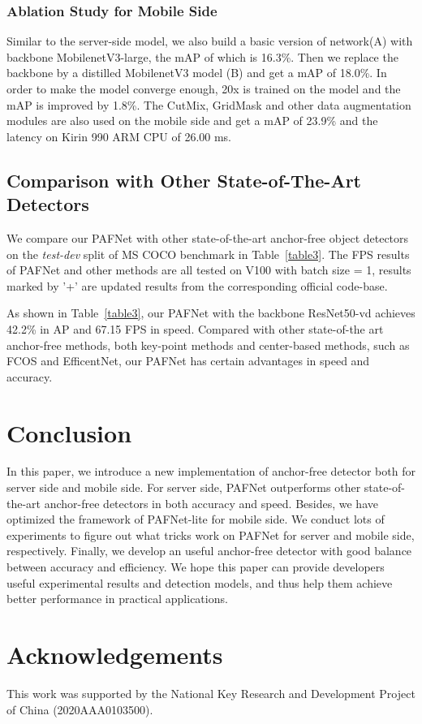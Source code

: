 \documentclass[10pt,twocolumn,letterpaper]{article}
\begin{document}
    \subsubsection{Ablation Study for Mobile Side}
    Similar to the server-side model, we also build a basic version of  network(A) with backbone MobilenetV3-large, the mAP of which is 16.3\%. Then we replace the backbone by a distilled MobilenetV3 model (B) and get a mAP of 18.0\%. In order to make the model converge enough, 20x is trained on the model and the mAP is improved by 1.8\%. The CutMix, GridMask and other data augmentation modules are also used on the mobile side and get a mAP of 23.9\% and the latency on Kirin 990 ARM CPU of 26.00 ms. 

    \subsection{Comparison with Other State-of-The-Art Detectors}
    We compare our PAFNet with other state-of-the-art anchor-free object detectors on the \textit{test-dev} split of MS COCO benchmark in Table~\ref{table3}. The FPS results of PAFNet and other methods are all tested on V100 with batch size = 1, results marked by '+' are updated results from the corresponding official code-base.
    
    As shown in Table~\ref{table3}, our PAFNet with the backbone ResNet50-vd achieves 42.2\% in AP and 67.15 FPS in speed. Compared with other state-of-the art anchor-free methods, both key-point methods and center-based methods, such as FCOS and EfficentNet, our PAFNet has certain advantages in speed and accuracy.
    




	\section{Conclusion}
	In this paper, we introduce a new implementation of anchor-free detector both for server side and mobile side. 
	For server side, PAFNet outperforms other state-of-the-art anchor-free detectors in both accuracy and speed. 
	Besides, we have optimized the framework of PAFNet-lite for mobile side. We conduct lots of experiments to figure out what tricks work on PAFNet for server and mobile side, respectively. Finally, we develop an useful anchor-free detector with good balance between accuracy and efficiency. We hope this paper can provide developers useful experimental results and detection models, and thus help them achieve better performance in practical applications.

     \section{Acknowledgements}
    This work was supported by the National Key Research and Development Project of China (2020AAA0103500).

	
	
\end{document}

